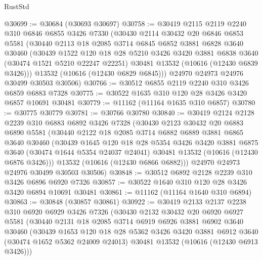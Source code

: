 \begin{lexlean}{RustStd}
\begin{coremodule}
@30699 := @30684 (@30693 @30697)
@30758 := @30419
    @2115
    @2119
    @2240
    @310
    @6846
    @6855
    @3426
    @7330
    (@30430
      @2114
      @30432
      @20
      @6846
      @6853
      @5581
      (@30440
        @2113
        @18
        @2085
        @3714
        @6845
        @6852
        @3881
        @6828
        @3640
        @30460
        (@30439
          @1522
          @120
          @18
          @28
          @5210
          @3426
          @3420
          @3881
          @6838
          @3640
          (@30474 @1521 @5210 @22247 @22251)
          @30481
          @13532
          (@10616 (@12430 @6839 @3426)))
        @13532
        (@10616 (@12430 @6829 @6845)))
      @24970
      @24973
      @24976
      @30499
      @30503
      @30506)
@30766 := @30512 @6855 @2119 @2240 @310 @3426 @6859 @6883 @7328
@30775 := @30522 @1635 @310 @120 @28 @3426 @3420 @6857 @10691 @30481
@30779 := @11162 (@11164 @1635 @310 @6857)
@30780 := @30775 @30779
@30781 := @30766 @30780
@30840 := @30419
    @2124
    @2128
    @2239
    @310
    @6883
    @6892
    @3426
    @7328
    (@30430
      @2123
      @30432
      @20
      @6883
      @6890
      @5581
      (@30440
        @2122
        @18
        @2085
        @3714
        @6882
        @6889
        @3881
        @6865
        @3640
        @30460
        (@30439
          @1645
          @120
          @18
          @28
          @5354
          @3426
          @3420
          @3881
          @6875
          @3640
          (@30474 @1644 @5354 @24037 @24041)
          @30481
          @13532
          (@10616 (@12430 @6876 @3426)))
        @13532
        (@10616 (@12430 @6866 @6882)))
      @24970
      @24973
      @24976
      @30499
      @30503
      @30506)
@30848 := @30512 @6892 @2128 @2239 @310 @3426 @6896 @6920 @7326
@30857 := @30522 @1640 @310 @120 @28 @3426 @3420 @6894 @10691 @30481
@30861 := @11162 (@11164 @1640 @310 @6894)
@30863 := @30848 (@30857 @30861)
@30922 := @30419
    @2133
    @2137
    @2238
    @310
    @6920
    @6929
    @3426
    @7326
    (@30430
      @2132
      @30432
      @20
      @6920
      @6927
      @5581
      (@30440
        @2131
        @18
        @2085
        @3714
        @6919
        @6926
        @3881
        @6902
        @3640
        @30460
        (@30439
          @1653
          @120
          @18
          @28
          @5362
          @3426
          @3420
          @3881
          @6912
          @3640
          (@30474 @1652 @5362 @24009 @24013)
          @30481
          @13532
          (@10616 (@12430 @6913 @3426)))

\end{coremodule}
\end{lexlean}
